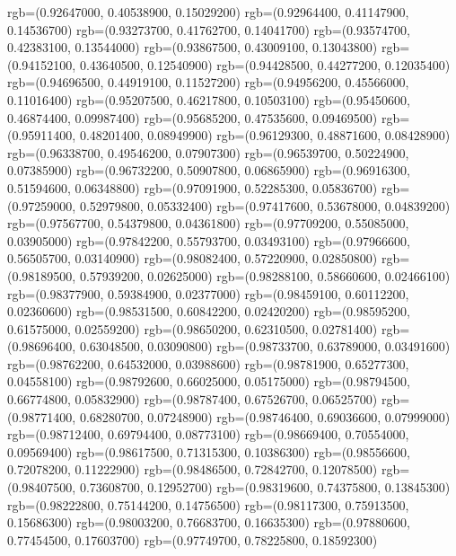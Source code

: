 {{        rgb=(0.92647000, 0.40538900, 0.15029200)
        rgb=(0.92964400, 0.41147900, 0.14536700)
        rgb=(0.93273700, 0.41762700, 0.14041700)
        rgb=(0.93574700, 0.42383100, 0.13544000)
        rgb=(0.93867500, 0.43009100, 0.13043800)
        rgb=(0.94152100, 0.43640500, 0.12540900)
        rgb=(0.94428500, 0.44277200, 0.12035400)
        rgb=(0.94696500, 0.44919100, 0.11527200)
        rgb=(0.94956200, 0.45566000, 0.11016400)
        rgb=(0.95207500, 0.46217800, 0.10503100)
        rgb=(0.95450600, 0.46874400, 0.09987400)
        rgb=(0.95685200, 0.47535600, 0.09469500)
        rgb=(0.95911400, 0.48201400, 0.08949900)
        rgb=(0.96129300, 0.48871600, 0.08428900)
        rgb=(0.96338700, 0.49546200, 0.07907300)
        rgb=(0.96539700, 0.50224900, 0.07385900)
        rgb=(0.96732200, 0.50907800, 0.06865900)
        rgb=(0.96916300, 0.51594600, 0.06348800)
        rgb=(0.97091900, 0.52285300, 0.05836700)
        rgb=(0.97259000, 0.52979800, 0.05332400)
        rgb=(0.97417600, 0.53678000, 0.04839200)
        rgb=(0.97567700, 0.54379800, 0.04361800)
        rgb=(0.97709200, 0.55085000, 0.03905000)
        rgb=(0.97842200, 0.55793700, 0.03493100)
        rgb=(0.97966600, 0.56505700, 0.03140900)
        rgb=(0.98082400, 0.57220900, 0.02850800)
        rgb=(0.98189500, 0.57939200, 0.02625000)
        rgb=(0.98288100, 0.58660600, 0.02466100)
        rgb=(0.98377900, 0.59384900, 0.02377000)
        rgb=(0.98459100, 0.60112200, 0.02360600)
        rgb=(0.98531500, 0.60842200, 0.02420200)
        rgb=(0.98595200, 0.61575000, 0.02559200)
        rgb=(0.98650200, 0.62310500, 0.02781400)
        rgb=(0.98696400, 0.63048500, 0.03090800)
        rgb=(0.98733700, 0.63789000, 0.03491600)
        rgb=(0.98762200, 0.64532000, 0.03988600)
        rgb=(0.98781900, 0.65277300, 0.04558100)
        rgb=(0.98792600, 0.66025000, 0.05175000)
        rgb=(0.98794500, 0.66774800, 0.05832900)
        rgb=(0.98787400, 0.67526700, 0.06525700)
        rgb=(0.98771400, 0.68280700, 0.07248900)
        rgb=(0.98746400, 0.69036600, 0.07999000)
        rgb=(0.98712400, 0.69794400, 0.08773100)
        rgb=(0.98669400, 0.70554000, 0.09569400)
        rgb=(0.98617500, 0.71315300, 0.10386300)
        rgb=(0.98556600, 0.72078200, 0.11222900)
        rgb=(0.98486500, 0.72842700, 0.12078500)
        rgb=(0.98407500, 0.73608700, 0.12952700)
        rgb=(0.98319600, 0.74375800, 0.13845300)
        rgb=(0.98222800, 0.75144200, 0.14756500)
        rgb=(0.98117300, 0.75913500, 0.15686300)
        rgb=(0.98003200, 0.76683700, 0.16635300)
        rgb=(0.97880600, 0.77454500, 0.17603700)
        rgb=(0.97749700, 0.78225800, 0.18592300)
}}
